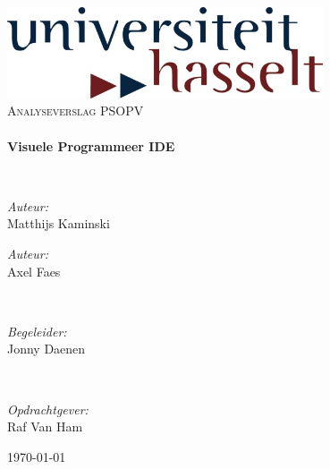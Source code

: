 \documentclass[]{article}
\begin{document}
\begin{titlepage}
\begin{center}

\includegraphics[width=0.7\textwidth]{./TitlePage/logo_UHasselt.png}~\\[1cm]

\textsc{\Large Analyseverslag PSOPV}\\[0.5cm]

\HRule \\[0.4cm]
{ \huge \bfseries Visuele Programmeer IDE \\[0.4cm] }

\HRule \\[1.5cm]

\noindent
\begin{minipage}{0.4\textwidth}
	\begin{flushleft} \large
	\emph{Auteur:}\\
	Matthijs Kaminski
	\end{flushleft}
	\end{minipage}%
\begin{minipage}{0.4\textwidth}
	\begin{flushright} \large
	\emph{Auteur:} \\
	Axel Faes
	\end{flushright}
\end{minipage}
\\[1cm]
\begin{minipage}{0.4\textwidth}
	\begin{center} \large
	\emph{Begeleider: } \\
	Jonny Daenen 
	\end{center} \large
\end{minipage}
\\[1cm]
\begin{minipage}{0.4\textwidth}
	\begin{center} \large
	\emph{Opdrachtgever:} \\
	Raf Van Ham
	\end{center}
\end{minipage}

\vfill

{\large \today}

\end{center}
\end{titlepage}
\end{document}
